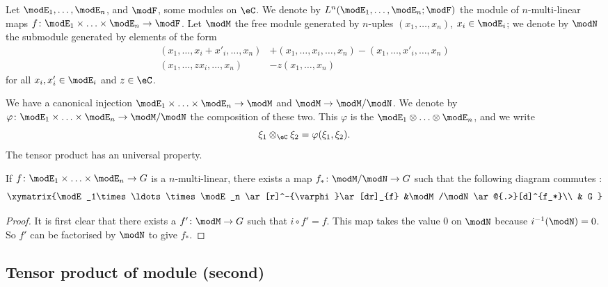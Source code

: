 Let $\modE_1,\ldots,\modE_n$, and $\modF$, some modules on $\eC$. We denote by $L^n(\modE_1,\ldots,\modE_n;\modF)$ the module of $n$-multi-linear maps $f\colon \modE_1\times\ldots\times\modE_n\to \modF$. Let $\modM$ the free module generated by $n$-uples $(x_1,\ldots,x_n)$, $x_i\in\modE_i$; we denote by $\modN$ the submodule generated by elements of the form
\begin{subequations}
\begin{align}
(x_1,\ldots,x_i+x'_i,\ldots,x_n)&+(x_1,\ldots,x_i,\ldots,x_n)-(x_1,\ldots,x'_i,\ldots,x_n)\\
(x_1,\ldots,zx_i,\ldots,x_n)&-z(x_1,\ldots,x_n)
\end{align}
\end{subequations}
for all $x_i,x'_i\in\modE_i$ and $z\in\eC$.

We have a canonical injection $\modE_1\times\ldots\times\modE_n\to\modM$ and $\modM\to\modM/\modN$. We denote by $\varphi\colon \modE_1\times\ldots\times\modE_n\to \modM/\modN$ the composition of these two. This $\varphi$ is the  $\modE_1\otimes\ldots\otimes\modE_n$, and we write
\[ 
  \xi_1\otimes_{\eC}\xi_2=\varphi(\xi_1,\xi_2).
\]
The tensor product has an universal property.

\begin{proposition}
If $f\colon \modE_1\times\ldots\times\modE_n\to G$ is a $n$-multi-linear, there exists a map $f_*\colon \modM/\modN\to G$ such that the following diagram commutes :
\begin{equation}
\xymatrix{%
   \modE_1\times\ldots\times\modE_n \ar[r]^-{\varphi}\ar[dr]_{f}		&\modM/\modN\ar@{.>}[d]^{f_*}\\
   									&	G
}
\end{equation}
\end{proposition}

\begin{proof}
It is first clear that there exists a $f'\colon \modM\to G$ such that $i\circ f'=f$. This map takes the value $0$ on $\modN$ because $i^{-1}(\modN)=0$. So $f'$ can be factorised by $\modN$ to give $f_*$.
\end{proof}

\subsection{Tensor product of module (second)}

